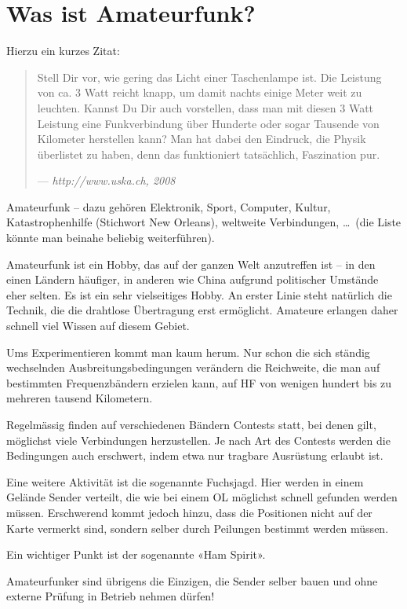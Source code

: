 \chapter{Was ist Amateurfunk?}
Hierzu ein kurzes Zitat:
\begin{quotation}
 Stell Dir vor, wie gering das Licht einer Taschenlampe ist. Die Leistung von ca. 3 Watt reicht knapp, um damit nachts einige Meter weit zu leuchten. Kannst Du Dir auch vorstellen, dass man mit diesen 3 Watt Leistung eine Funkverbindung über Hunderte oder sogar Tausende von Kilometer herstellen kann? Man hat dabei den Eindruck, die Physik überlistet zu haben, denn das funktioniert tatsächlich, Faszination pur.
 
 \hspace{\fill} --- \textit{http://www.uska.ch, 2008}
\end{quotation}


Amateurfunk – dazu gehören Elektronik, Sport, Computer, Kultur, Katastrophenhilfe (Stichwort New Orleans), weltweite Verbindungen, \dots\ (die Liste könnte man beinahe beliebig weiterführen).

Amateurfunk ist ein Hobby, das auf der ganzen Welt anzutreffen ist – in den einen Ländern häufiger, in anderen wie China aufgrund politischer Umstände eher selten. Es ist ein sehr vielseitiges Hobby. An erster Linie steht natürlich die Technik, die die drahtlose Übertragung erst ermöglicht. Amateure erlangen daher schnell viel Wissen auf diesem Gebiet.

Ums Experimentieren kommt man kaum herum. Nur schon die sich ständig wechselnden Ausbreitungsbedingungen verändern die Reichweite, die man auf bestimmten Frequenzbändern erzielen kann, auf HF von wenigen hundert bis zu mehreren tausend Kilometern.

Regelmässig finden auf verschiedenen Bändern Contests statt, bei denen gilt, möglichst viele Verbindungen herzustellen. Je nach Art des Contests werden die Bedingungen auch erschwert, indem etwa nur tragbare Ausrüstung erlaubt ist.

Eine weitere Aktivität ist die sogenannte Fuchsjagd. Hier werden in einem Gelände Sender verteilt, die wie bei einem OL möglichst schnell gefunden werden müssen. Erschwerend kommt jedoch hinzu, dass die Positionen nicht auf der Karte vermerkt sind, sondern selber durch Peilungen bestimmt werden müssen.

Ein wichtiger Punkt ist der sogenannte «Ham Spirit».

Amateurfunker sind übrigens die Einzigen, die Sender selber bauen und ohne externe Prüfung in Betrieb nehmen dürfen!

